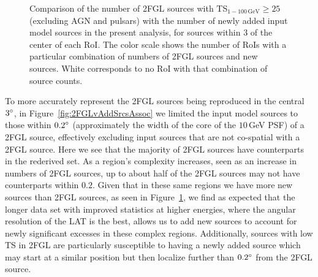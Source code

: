 \begin{figure}[h!]
	\centering
	\caption[Comparison of the number of 2FGL sources with with the number of newly added input model sources.]{Comparison of the number of 2FGL sources with TS$_{1-100\,\mathrm{GeV}} \geq 25$ (excluding AGN and pulsars) with the number of newly added input model sources in the present analysis, for sources within $3$\degr{} of the center of each RoI. The color scale shows the number of RoIs with a particular combination of numbers of 2FGL sources and new sources. White corresponds to no RoI with that combination of source counts.}
	\label{fig:2FGLvAddSrcs} 
\end{figure}

To more accurately represent the 2FGL sources being reproduced in the central $3\mbox{$^\circ$}$, in Figure~\ref{fig:2FGLvAddSrcsAssoc} we limited the input model sources to those within $0.2\mbox{$^\circ$}$ (approximately the width of the core of the $10$\,GeV PSF) of a 2FGL source, effectively excluding input sources that are not co-spatial with a 2FGL source. Here we see that the majority of 2FGL sources have counterparts in the rederived set. As a region's complexity increases, seen as an increase in numbers of 2FGL sources, up to about half of the 2FGL sources may not have counterparts within $0.2$\degr. Given that in these same regions we have more new sources than 2FGL sources, as seen in Figure~\ref{fig:2FGLvAddSrcs}, we find as expected that the longer data set with improved statistics at higher energies, where the angular resolution of the LAT is the best, allows us to add new sources to account for newly significant excesses in these complex regions. Additionally, sources with low TS in 2FGL are particularly susceptible to having a newly added source which may start at a similar position but then localize further than $0.2\mbox{$^\circ$}$ from the 2FGL source. 

